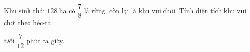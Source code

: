 \begin{ex} %
Khu sinh thái $128\text{ ha}$ có $\dfrac{7}{8}$ là rừng, còn lại là khu vui chơi. Tính diện tích khu vui chơi theo héc-ta.
\end{ex}

\begin{ex} %
Đổi $\dfrac{7}{12}\text{ phút}$ ra giây.
\end{ex}
